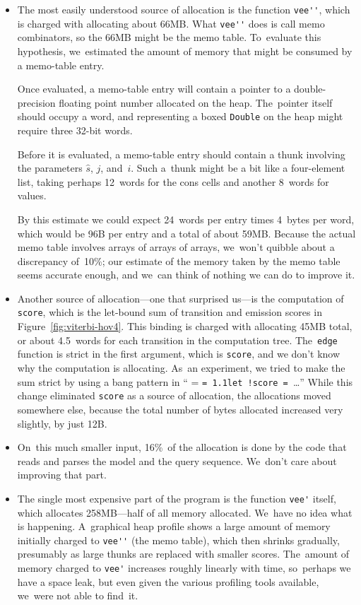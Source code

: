 \documentclass[]{jfp1}
\makeatletter
\newcommand\figref[1]{Figure~\ref{fig:#1}}
\newcommand{\mono}[1]{%
  {\@tempdima = \fontdimen2\font
   \texttt{\spaceskip = 1.1\@tempdima #1}}}
\makeatother
\begin{document}
\begin{itemize}
\item
The most easily understood source of allocation
is the function \verb+vee''+, which is charged with
allocating about 66MB.
What \verb+vee''+ does is call memo combinators,
so the 66MB might be the memo table.
To~evaluate this hypothesis, we~estimated the amount of memory that
might be consumed by a memo-table entry.

Once evaluated, a memo-table entry will contain a pointer to a
double-precision floating point number allocated on the heap.
The~pointer itself should occupy a word, and representing a
boxed \texttt{Double} on the heap might
require three 32-bit words.

Before it is evaluated, a memo-table entry should contain a thunk
involving the parameters $\hat s$, $j$, and~$i$.
Such 
a~thunk might be a bit like a four-element
list, taking perhaps 12~words for the cons cells and another 8~words
for  values.

By this estimate we could expect
24~words per entry times 4~bytes per word, which would be 96B per
entry and a total of about 59MB.
Because the actual memo table involves arrays of arrays of arrays,
we~won't quibble about a discrepancy of~10\%; 
our estimate of the memory taken by the memo table seems accurate
enough, and we~can think of nothing we can do to improve it.
\item
Another source of allocation---one that surprised us---is the 
computation of \texttt{score}, which is the let-bound sum of transition 
and emission scores in \figref{viterbi-hov4}.
This binding is charged with allocating 45MB total, or about
4.5~words for each transition in the computation tree.
The~\texttt{edge} function is strict in the first argument, which
is \texttt{score}, and we don't know why the computation is allocating.
As~an experiment, we tried to make
the sum strict by using a bang pattern in 
``\mono{let~!score = }\ldots''
While this change eliminated \texttt{score} as a source of allocation,
the allocations moved somewhere else, because the total number of
bytes allocated increased very slightly, by just 12B.
\item
On~this much smaller input, 16\%\ of the allocation is done by the
code that reads and parses the model and the query sequence.
We~don't care about improving that part.
\item
The single most expensive part of the program
is the function \verb+vee'+ itself, which
allocates 258MB---half of all memory allocated.
We~have no idea what is happening.
A~graphical heap profile shows a large amount of memory initially
charged to \verb+vee''+ (the memo table), which then shrinks
gradually, presumably as large thunks are replaced with smaller
scores.
The~amount of memory charged to \verb+vee'+
increases roughly linearly with time, 
so~perhaps we have a space leak, but even given the various profiling
tools available, we~were not able to find~it.


\end{itemize}
\end{document}
